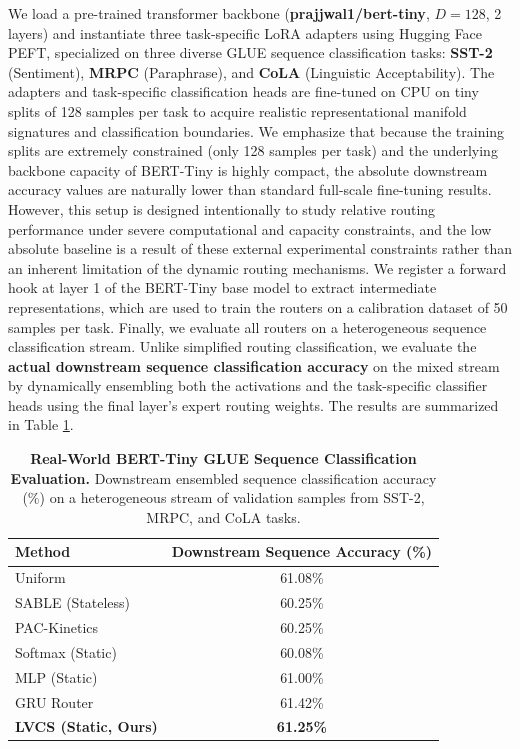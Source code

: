 We load a pre-trained transformer backbone (\textbf{prajjwal1/bert-tiny}, $D=128$, 2 layers) and instantiate three task-specific LoRA adapters using Hugging Face PEFT, specialized on three diverse GLUE sequence classification tasks: \textbf{SST-2} (Sentiment), \textbf{MRPC} (Paraphrase), and \textbf{CoLA} (Linguistic Acceptability). The adapters and task-specific classification heads are fine-tuned on CPU on tiny splits of 128 samples per task to acquire realistic representational manifold signatures and classification boundaries. We emphasize that because the training splits are extremely constrained (only 128 samples per task) and the underlying backbone capacity of BERT-Tiny is highly compact, the absolute downstream accuracy values are naturally lower than standard full-scale fine-tuning results. However, this setup is designed intentionally to study relative routing performance under severe computational and capacity constraints, and the low absolute baseline is a result of these external experimental constraints rather than an inherent limitation of the dynamic routing mechanisms. We register a forward hook at layer 1 of the BERT-Tiny base model to extract intermediate representations, which are used to train the routers on a calibration dataset of 50 samples per task. Finally, we evaluate all routers on a heterogeneous sequence classification stream. Unlike simplified routing classification, we evaluate the \textbf{actual downstream sequence classification accuracy} on the mixed stream by dynamically ensembling both the activations and the task-specific classifier heads using the final layer's expert routing weights. The results are summarized in Table \ref{tab:real_world_glue}.

\begin{table}[htbp]
\caption{\textbf{Real-World BERT-Tiny GLUE Sequence Classification Evaluation.} Downstream ensembled sequence classification accuracy ($\%$) on a heterogeneous stream of validation samples from SST-2, MRPC, and CoLA tasks.}
\label{tab:real_world_glue}
\vskip 0.15in
\begin{center}
\begin{small}
\begin{sc}
\begin{tabular}{lc}
\toprule
Method & Downstream Sequence Accuracy (\%) \\
\midrule
Uniform & 61.08\% \\
SABLE (Stateless) & 60.25\% \\
PAC-Kinetics & 60.25\% \\
Softmax (Static) & 60.08\% \\
MLP (Static) & 61.00\% \\
GRU Router & 61.42\% \\
\textbf{LVCS (Static, Ours)} & \textbf{61.25\%} \\
\bottomrule
\end{tabular}
\end{sc}
\end{small}
\end{center}
\vskip -0.1in
\end{table}

